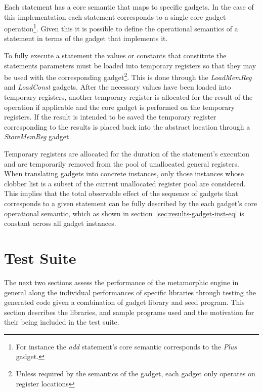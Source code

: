 \documentclass[finalcopy,short]{srpaper}
\begin{document}
            Each statement has a core semantic that maps to specific gadgets. In
            the case of this implementation each statement corresponds to a
            single core gadget operation\footnote{For instance the \emph{add}
            statement's core semantic corresponds to the \emph{Plus} gadget.}.
            Given this it is possible to define the operational semantics of a
            statement in terms of the gadget that implements it.

            To fully execute a statement the values or constants that constitute
            the statements parameters must be loaded into temporary registers so
            that they may be used with the corresponding gadget\footnote{Unless
            required by the semantics of the gadget, each gadget only operates
            on register locations}.  This is done through the \emph{LoadMemReg}
            and \emph{LoadConst} gadgets. After the necessary values have been
            loaded into temporary registers, another temporary register is
            allocated for the result of the operation if applicable and the core
            gadget is performed on the temporary registers. If the result is
            intended to be saved the temporary register corresponding to the
            results is placed back into the abstract location through a
            \emph{StoreMemReg} gadget.
            
            Temporary registers are allocated for the duration of the
            statement's execution and are temporarily removed from the pool of
            unallocated general registers. When translating gadgets into
            concrete instances, only those instances whose clobber list is a
            subset of the current unallocated register pool are considered. This
            implies that the total observable effect of the sequence of gadgets
            that corresponds to a given statement can be fully described by the
            each gadget's core operational semantic, which as shown in
            section~\ref{sec:results-gadget-inst-eq} is constant across all gadget
            instances.
        
    \section{Test Suite}
        
        The next two sections assess the performance of the metamorphic engine
        in general along the individual performances of specific libraries
        through testing the generated code given a combination of gadget library
        and seed program. This section describes the libraries, and sample
        programs used and the motivation for their being included in the test
        suite.
\end{document}

